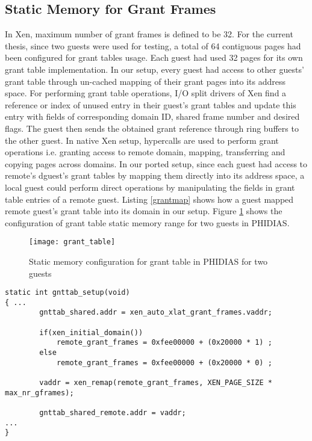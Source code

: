 \subsection{Static Memory for Grant Frames\label{sec:granttablesframes}}
In Xen, maximum number of grant frames is defined to be 32. For the current thesis, since two guests were used for testing, a total of 64 contiguous pages had been configured for grant tables usage. Each guest had used 32 pages for its own grant table implementation. In our setup, every guest had access to other guests' grant table through un-cached mapping of their grant pages into its address space. For performing grant table operations, I/O split drivers of Xen find a reference or index of unused entry in their guest's grant tables and update this entry with fields of corresponding domain ID, shared frame number and desired flags. The guest then sends the obtained grant reference through ring buffers to the other guest. In native Xen setup, hypercalls are used to perform grant operations i.e. granting access to remote domain, mapping, transferring and copying pages across domains. In our ported setup, since each guest had access to remote's dguest's grant tables by mapping them directly into its address space, a local guest could perform direct operations by manipulating the fields in grant table entries of a remote guest. Listing \ref{grantmap} shows how a guest mapped remote guest's grant table into its domain in our setup. Figure \ref{grant_table} shows the configuration of grant table static memory range for two guests in PHIDIAS.
\begin{figure}[!htbp]
	\centering
	\texttt{[image: grant\_table]}
	\caption{Static memory configuration for grant table in PHIDIAS for two guests}
	\label{grant_table}
\end{figure}
\begin{lstlisting}[caption=Code snippet for mapping remote guest's grant table in case of two guests configured for the ported setup , label={grantmap}]
static int gnttab_setup(void)
{ ...
        gnttab_shared.addr = xen_auto_xlat_grant_frames.vaddr;
        
        if(xen_initial_domain())
            remote_grant_frames = 0xfee00000 + (0x20000 * 1) ;
        else
            remote_grant_frames = 0xfee00000 + (0x20000 * 0) ;
            
        vaddr = xen_remap(remote_grant_frames, XEN_PAGE_SIZE * max_nr_gframes);
        
        gnttab_shared_remote.addr = vaddr;
...
}
\end{lstlisting}

